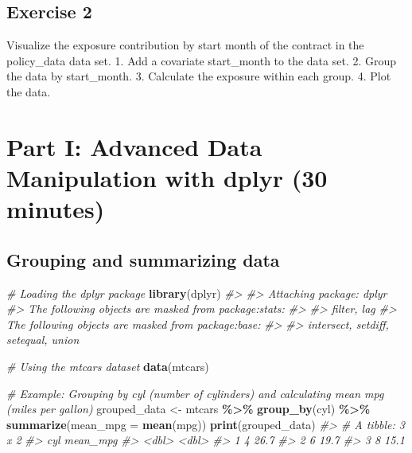 \documentclass[
]{book}
\newenvironment{Shaded}{\begin{snugshade}}{\end{snugshade}}
\newcommand{\AttributeTok}[1]{\textcolor[rgb]{0.13,0.29,0.53}{#1}}
\newcommand{\CommentTok}[1]{\textcolor[rgb]{0.56,0.35,0.01}{\textit{#1}}}
\newcommand{\FunctionTok}[1]{\textcolor[rgb]{0.13,0.29,0.53}{\textbf{#1}}}
\newcommand{\NormalTok}[1]{#1}
\newcommand{\OtherTok}[1]{\textcolor[rgb]{0.56,0.35,0.01}{#1}}
\newcommand{\SpecialCharTok}[1]{\textcolor[rgb]{0.81,0.36,0.00}{\textbf{#1}}}
\begin{document}
\section*{Exercise 2}\label{exercise-2-7}

Visualize the exposure contribution by start month of the contract in the policy\_data data set.
1. Add a covariate start\_month to the data set. 2. Group the data by start\_month.
3. Calculate the exposure within each group.
4. Plot the data.

\chapter*{Part I: Advanced Data Manipulation with dplyr (30 minutes)}\label{part-i-advanced-data-manipulation-with-dplyr-30-minutes}

\section*{Grouping and summarizing data}\label{grouping-and-summarizing-data}

\begin{Shaded}
\begin{Highlighting}[]
\CommentTok{\# Loading the dplyr package}
\FunctionTok{library}\NormalTok{(dplyr)}
\CommentTok{\#\textgreater{} }
\CommentTok{\#\textgreater{} Attaching package: \textquotesingle{}dplyr\textquotesingle{}}
\CommentTok{\#\textgreater{} The following objects are masked from \textquotesingle{}package:stats\textquotesingle{}:}
\CommentTok{\#\textgreater{} }
\CommentTok{\#\textgreater{}     filter, lag}
\CommentTok{\#\textgreater{} The following objects are masked from \textquotesingle{}package:base\textquotesingle{}:}
\CommentTok{\#\textgreater{} }
\CommentTok{\#\textgreater{}     intersect, setdiff, setequal, union}

\CommentTok{\# Using the \textquotesingle{}mtcars\textquotesingle{} dataset}
\FunctionTok{data}\NormalTok{(mtcars)}

\CommentTok{\# Example: Grouping by \textquotesingle{}cyl\textquotesingle{} (number of cylinders) and calculating mean mpg (miles per gallon)}
\NormalTok{grouped\_data }\OtherTok{\textless{}{-}}\NormalTok{ mtcars }\SpecialCharTok{\%\textgreater{}\%}
  \FunctionTok{group\_by}\NormalTok{(cyl) }\SpecialCharTok{\%\textgreater{}\%}
  \FunctionTok{summarize}\NormalTok{(}\AttributeTok{mean\_mpg =} \FunctionTok{mean}\NormalTok{(mpg))}
\FunctionTok{print}\NormalTok{(grouped\_data)}
\CommentTok{\#\textgreater{} \# A tibble: 3 x 2}
\CommentTok{\#\textgreater{}     cyl mean\_mpg}
\CommentTok{\#\textgreater{}   \textless{}dbl\textgreater{}    \textless{}dbl\textgreater{}}
\CommentTok{\#\textgreater{} 1     4     26.7}
\CommentTok{\#\textgreater{} 2     6     19.7}
\CommentTok{\#\textgreater{} 3     8     15.1}
\end{Highlighting}
\end{Shaded}
\end{document}
